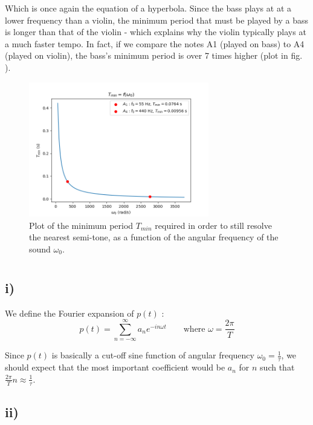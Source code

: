 \documentclass{article}
\begin{document}
Which is once again the equation of a hyperbola. Since the bass plays at at a lower 
frequency than a violin, the minimum period that must be played by a bass is longer 
than that of the violin - which explains why the violin typically plays at a much 
faster tempo. In fact, if we compare the notes A1 (played on bass) to A4 (played on violin), the bass's minimum period is over 7 times higher (plot in fig. ).


\begin{figure}
    \centering
    \includegraphics[width=0.7\textwidth]{figs/Tmin_vs_omega.png}
    \caption{Plot of the minimum period $T_{min}$ required in order to still resolve the nearest semi-tone, as a function of the angular frequency of the sound $\omega_0$.}
    \label{fig:violin_vs_bass}
\end{figure}


\newpage
\section{}
\subsection*{i)}

We define the Fourier expansion of $p(t)$ :
\begin{equation}
    p(t) = \sum_{n=-\infty}^{\infty} a_n e^{-in\omega t}
    \qquad
    \textrm{where }\omega = \frac{2\pi}{T}
\end{equation}

Since $p(t)$ is basically a cut-off sine function of angular frequency $\omega_0 = \frac{1}{\tau}$, 
we should expect that the most important coefficient would be $a_n$ for $n$ such that $\frac{2\pi}{T}n \approx \frac{1}{\tau}$.

\subsection*{ii)}
\end{document}

